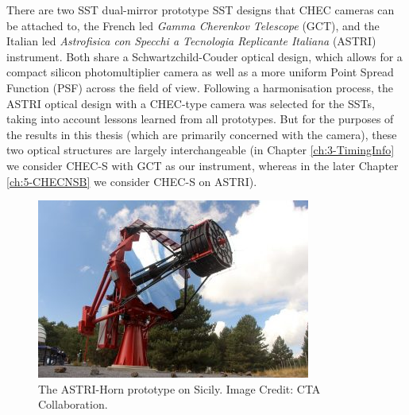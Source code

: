 There are two SST dual-mirror prototype SST designs that CHEC cameras can be attached to, the French led \textit{Gamma Cherenkov Telescope} (GCT), and the Italian led \textit{Astrofisica con Specchi a Tecnologia Replicante Italiana} (ASTRI) instrument. Both share a Schwartzchild-Couder optical design, which allows for a compact silicon photomultiplier camera as well as a more uniform Point Spread Function (PSF) across the field of view. Following a harmonisation process, the ASTRI optical design with a CHEC-type camera was selected for the SSTs, taking into account lessons learned from all prototypes. But for the purposes of the results in this thesis (which are primarily concerned with the camera), these two optical structures are largely interchangeable (in Chapter \ref{ch:3-TimingInfo} we consider CHEC-S with GCT as our instrument, whereas in the later  Chapter \ref{ch:5-CHECNSB} we consider CHEC-S on ASTRI). 

\begin{figure}[ht] 
        \centering \includegraphics[width=\columnwidth]{figures/astri-horn.jpg}
        \caption{
                \label{fig:astri} %
                The ASTRI-Horn prototype on Sicily. Image Credit: CTA Collaboration.
        }
\end{figure}

